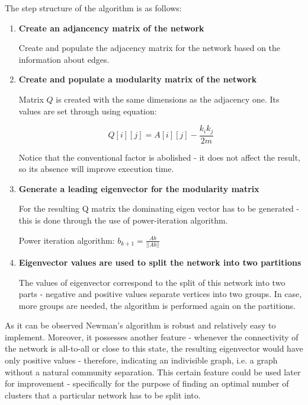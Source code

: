 \clearpage

The step structure of the algorithm is as follows:

\begin{enumerate}
\item{\textbf{Create an adjancency matrix of the network}}

Create and populate the adjacency matrix for the network based on the information about edges.

\item{\textbf{Create and populate a modularity matrix of the network}}

Matrix $Q$ is created with the same dimensions as the adjacency one. Its values are set through using equation:

\begin{equation}Q[i][j] = A[i][j] - \frac{k_{i}k_{j}}{2m}\end{equation}

Notice that the conventional factor is abolished - it does not affect the result, so its absence will improve execution time.

\item{\textbf{Generate a leading eigenvector for the modularity matrix}}

For the resulting Q matrix the dominating eigen vector has to be generated - this is done through the use of power-iteration algorithm\cite{VonMises1929}.

Power iteration algorithm: $b_{k+1} = \frac{Ab}{||Ab||}$

\item{\textbf{Eigenvector values are used to split the network into two partitions}}

The values of eigenvector correspond to the split of this network into two parts - negative and positive values separate vertices into two groups. In case, more groups are needed, the algorithm is performed again on the partitions.

\end{enumerate}

As it can be observed Newman's algorithm is robust and relatively easy to implement. Moreover, it possesses another feature - whenever the connectivity of the network is all-to-all or close to this state, the resulting eigenvector would have only positive values - therefore, indicating an indivisible graph, i.e. a graph without a natural community separation. This certain feature could be used later for improvement - specifically for the purpose of finding an optimal number of clusters that a particular network has to be split into.

